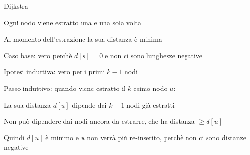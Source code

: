\begin{frame}{Dijkstra}

\begin{myboxtitle}
\BIL 
\item Ogni nodo viene estratto una e una sola volta
\item Al momento dell'estrazione la sua distanza è minima    
\EIL
\end{myboxtitle}


\BIL
\item Caso base: vero perchè $d[s]=0$ e non ci sono lunghezze negative
\item Ipotesi induttiva: vero per i primi $k-1$ nodi
\item Passo induttivo: quando viene estratto il $k$-esimo nodo $u$:
  \BI
  \item La sua distanza $d[u]$ dipende dai $k-1$ nodi già estratti
  \item Non può dipendere dai nodi ancora da estrarre, che ha distanza $\geq d[u]$
  \item Quindi $d[u]$ è minimo e $u$ non verrà più re-inserito, perchè non ci sono distanze negative
\EI
\EIL

\end{frame}

